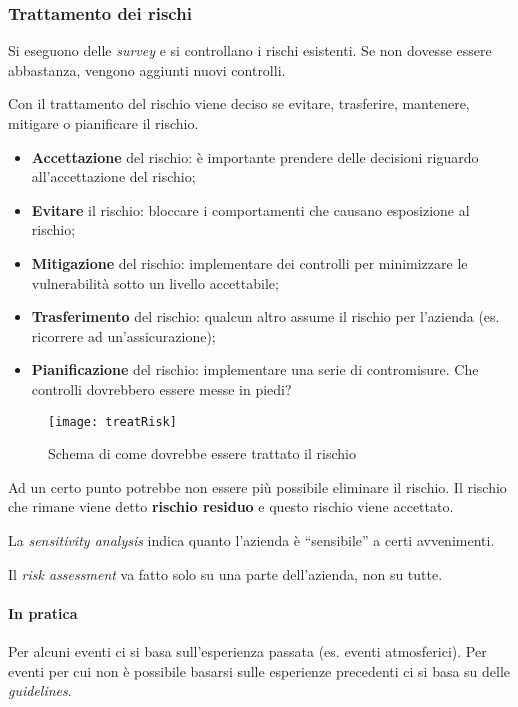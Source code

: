 \subsubsection{Trattamento dei rischi}

Si eseguono delle \textit{survey} e si controllano i rischi esistenti. Se non
dovesse essere abbastanza, vengono aggiunti nuovi controlli.

Con il trattamento del rischio viene deciso se evitare, trasferire, mantenere,
mitigare o pianificare il rischio.

\begin{itemize}
\item \textbf{Accettazione} del rischio: è importante prendere delle decisioni
riguardo all'accettazione del rischio;
\item \textbf{Evitare} il rischio: bloccare i comportamenti che causano
esposizione al rischio;
\item \textbf{Mitigazione} del rischio: implementare dei controlli per
minimizzare le vulnerabilità sotto un livello accettabile;
\item \textbf{Trasferimento} del rischio: qualcun altro assume il rischio per
l'azienda (es. ricorrere ad un'assicurazione);
\item \textbf{Pianificazione} del rischio: implementare una serie di
contromisure. Che controlli dovrebbero essere messe in piedi?
\end{itemize}

\begin{figure}[H]
 \centering
 \texttt{[image: treatRisk]}
 \caption{Schema di come dovrebbe essere trattato il rischio}
\end{figure}



Ad un certo punto potrebbe non essere più possibile eliminare il rischio. Il
rischio che rimane viene detto \textbf{rischio residuo} e questo rischio viene
accettato.

La \textit{sensitivity analysis} indica quanto l'azienda è ``sensibile'' a
certi avvenimenti.

Il \textit{risk assessment} va fatto solo su una parte dell'azienda, non su
tutte.

\paragraph*{In pratica}

Per alcuni eventi ci si basa sull'esperienza passata (es. eventi atmosferici).
Per eventi per cui non è possibile basarsi sulle esperienze precedenti ci si
basa su delle \textit{guidelines}.

